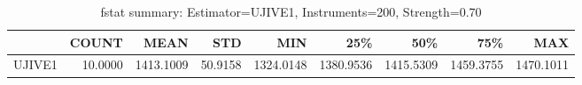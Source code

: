 \begin{table}[ht]
\centering
\caption{fstat summary: Estimator=UJIVE1, Instruments=200, Strength=0.70}
\begin{tabular}{lrrrrrrrr}
\toprule
 & COUNT & MEAN & STD & MIN & 25\% & 50\% & 75\% & MAX \\
\midrule
UJIVE1 & 10.0000 & 1413.1009 & 50.9158 & 1324.0148 & 1380.9536 & 1415.5309 & 1459.3755 & 1470.1011 \\
\bottomrule
\end{tabular}
\end{table}
